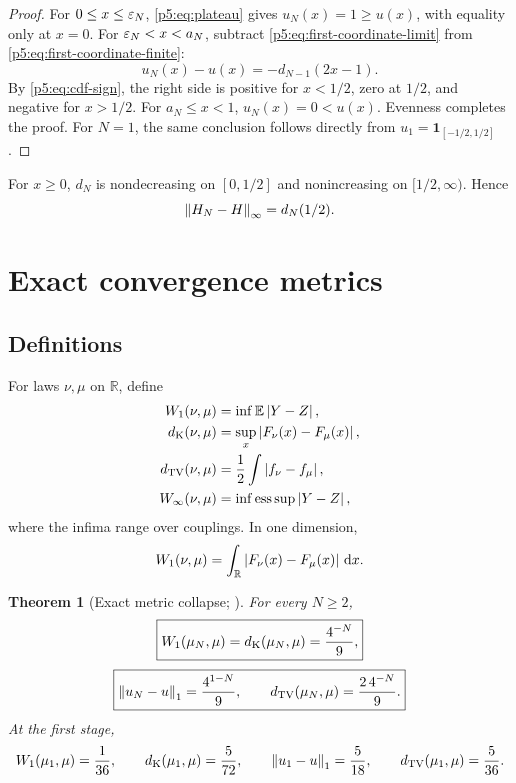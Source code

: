\documentclass[11pt,oneside]{article}
\numberwithin{equation}{section}
\newtheorem{theorem}{Theorem}[section]
\theoremstyle{definition}
\theoremstyle{remark}
\newcommand{\R}{\mathbb R}
\newcommand{\E}{\mathbb E}
\newcommand{\dd}{\,\mathrm d}
\begin{document}
\begin{proof}
For $0\le x\le\varepsilon_N$, \eqref{p5:eq:plateau} gives $u_N(x)=1\ge u(x)$, with equality only at $x=0$.  For $\varepsilon_N<x<a_N$, subtract \eqref{p5:eq:first-coordinate-limit} from \eqref{p5:eq:first-coordinate-finite}:
\begin{equation}
 u_N(x)-u(x)=-d_{N-1}(2x-1).
 \label{p5:eq:error-cdf-identity}
\end{equation}
By \eqref{p5:eq:cdf-sign}, the right side is positive for $x<1/2$, zero at $1/2$, and negative for $x>1/2$.  For $a_N\le x<1$, $u_N(x)=0<u(x)$.  Evenness completes the proof.  For $N=1$, the same conclusion follows directly from $u_1=\mathbf1_{[-1/2,1/2]}$.
\end{proof}

\begin{corollary}
For $x\ge0$, $d_N$ is nondecreasing on $[0,1/2]$ and nonincreasing on $[1/2,\infty)$.  Hence
\begin{equation}
 \left\lVert H_N-H\right\rVert_{\infty}=d_N(1/2).
 \label{p5:eq:dk-at-half}
\end{equation}
\end{corollary}

\section{Exact convergence metrics}
\label{p5:sec:metrics}

\subsection{Definitions}

For laws $\nu,\mu$ on $\R$, define
\begin{align}
 W_1(\nu,\mu)&=\inf\E\abs{Y-Z},\\
 d_{\rm K}(\nu,\mu)&=\sup_x\abs{F_\nu(x)-F_\mu(x)},\\
 d_{\rm TV}(\nu,\mu)&=\frac12\int\abs{f_\nu-f_\mu},\\
 W_\infty(\nu,\mu)&=\inf\operatorname*{ess\,sup}\abs{Y-Z},
\end{align}
where the infima range over couplings.  In one dimension,
\begin{equation}
 W_1(\nu,\mu)=\int_{\R}\abs{F_\nu(x)-F_\mu(x)}\dd x.
 \label{p5:eq:w1-cdf}
\end{equation}

\begin{theorem}[Exact metric collapse; \newresult]
For every $N\ge2$,
\begin{equation}
 \boxed{
 W_1(\mu_N,\mu)
 =d_{\rm K}(\mu_N,\mu)
 =\frac{4^{-N}}9,}
 \label{p5:eq:w1-dk}
\end{equation}
\begin{equation}
 \boxed{
 \left\lVert u_N-u\right\rVert_1=\frac{4^{1-N}}9,
 \qquad
 d_{\rm TV}(\mu_N,\mu)=\frac{2\,4^{-N}}9.}
 \label{p5:eq:tv-exact}
\end{equation}
At the first stage,
\begin{equation}
 W_1(\mu_1,\mu)=\frac1{36},
 \qquad
 d_{\rm K}(\mu_1,\mu)=\frac5{72},
 \qquad
 \left\lVert u_1-u\right\rVert_1=\frac5{18},
 \qquad
 d_{\rm TV}(\mu_1,\mu)=\frac5{36}.
 \label{p5:eq:first-exception}
\end{equation}
\end{theorem}
\end{document}
